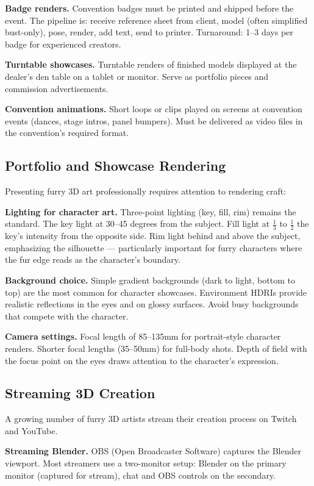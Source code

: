 \textbf{Badge renders.} Convention badges must be printed and shipped before the event. The pipeline is: receive reference sheet from client, model (often simplified bust-only), pose, render, add text, send to printer. Turnaround: 1--3 days per badge for experienced creators.

\textbf{Turntable showcases.} Turntable renders of finished models displayed at the dealer's den table on a tablet or monitor. Serve as portfolio pieces and commission advertisements.

\textbf{Convention animations.} Short loops or clips played on screens at convention events (dances, stage intros, panel bumpers). Must be delivered as video files in the convention's required format.


\subsection{Portfolio and Showcase Rendering}

Presenting furry 3D art professionally requires attention to rendering craft:

\textbf{Lighting for character art.} Three-point lighting (key, fill, rim) remains the standard. The key light at 30--45 degrees from the subject. Fill light at $\frac{1}{3}$ to $\frac{1}{2}$ the key's intensity from the opposite side. Rim light behind and above the subject, emphasizing the silhouette --- particularly important for furry characters where the fur edge reads as the character's boundary.

\textbf{Background choice.} Simple gradient backgrounds (dark to light, bottom to top) are the most common for character showcases. Environment HDRIs provide realistic reflections in the eyes and on glossy surfaces. Avoid busy backgrounds that compete with the character.

\textbf{Camera settings.} Focal length of 85--135mm for portrait-style character renders. Shorter focal lengths (35--50mm) for full-body shots. Depth of field with the focus point on the eyes draws attention to the character's expression.


\subsection{Streaming 3D Creation}

A growing number of furry 3D artists stream their creation process on Twitch and YouTube.

\textbf{Streaming Blender.} OBS (Open Broadcaster Software) captures the Blender viewport. Most streamers use a two-monitor setup: Blender on the primary monitor (captured for stream), chat and OBS controls on the secondary.

